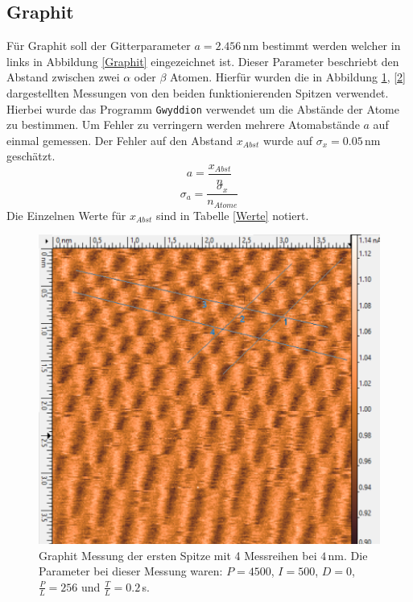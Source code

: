 \subsection{Graphit}
Für Graphit soll der Gitterparameter $a=2.456 \,$nm bestimmt werden welcher in links in Abbildung \ref{Graphit} eingezeichnet ist. Dieser Parameter beschriebt den Abstand zwischen zwei $\alpha$ oder $\beta$ Atomen. Hierfür wurden die in Abbildung \ref{1}, \ref{2} dargestellten Messungen von den beiden funktionierenden Spitzen verwendet.
Hierbei wurde das Programm \verb|Gwyddion| verwendet um die Abstände der Atome zu bestimmen.
Um Fehler zu verringern werden mehrere Atomabstände $a$ auf einmal gemessen. Der Fehler auf den Abstand $x_{Abst}$ wurde auf $\sigma_{x}=0.05\,$nm geschätzt.
\begin{equation}
	a = \frac{x_{Abst}}{n}
\end{equation}
\begin{equation*}
	\sigma_{a} = \frac{\sigma_{x}}{n_{Atome}}
\end{equation*}
Die Einzelnen Werte für $x_{Abst}$ sind in Tabelle \ref{Werte} notiert.
\begin{figure}[ht]
	\includegraphics[scale=0.7]{Bild/Graphit2}
	\centering
	\caption[Messung von Graphit bei Spitze 1]{ Graphit Messung der ersten Spitze mit 4 Messreihen bei $4$\,nm. Die Parameter bei dieser Messung waren:  $P=4500$, $I=500$, $D=0$, $\frac{P}{L}=256$ und $\frac{T}{L}=0.2\,$s.}
	\label{1}
\end{figure}
